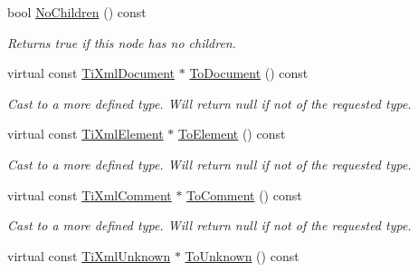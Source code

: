 \begin{DoxyCompactItemize}
\item 
bool \hyperlink{class_ti_xml_node_aeed21ad30630ef6e7faf096127edc9f3}{No\+Children} () const \hypertarget{class_ti_xml_node_aeed21ad30630ef6e7faf096127edc9f3}{}\label{class_ti_xml_node_aeed21ad30630ef6e7faf096127edc9f3}

\begin{DoxyCompactList}\small\item\em Returns true if this node has no children. \end{DoxyCompactList}\item 
virtual const \hyperlink{class_ti_xml_document}{Ti\+Xml\+Document} $\ast$ \hyperlink{class_ti_xml_node_a8a4cda4b15c29f64cff419309aebed08}{To\+Document} () const \hypertarget{class_ti_xml_node_a8a4cda4b15c29f64cff419309aebed08}{}\label{class_ti_xml_node_a8a4cda4b15c29f64cff419309aebed08}

\begin{DoxyCompactList}\small\item\em Cast to a more defined type. Will return null if not of the requested type. \end{DoxyCompactList}\item 
virtual const \hyperlink{class_ti_xml_element}{Ti\+Xml\+Element} $\ast$ \hyperlink{class_ti_xml_node_a72abed96dc9667ab9e0a2a275301bb1c}{To\+Element} () const \hypertarget{class_ti_xml_node_a72abed96dc9667ab9e0a2a275301bb1c}{}\label{class_ti_xml_node_a72abed96dc9667ab9e0a2a275301bb1c}

\begin{DoxyCompactList}\small\item\em Cast to a more defined type. Will return null if not of the requested type. \end{DoxyCompactList}\item 
virtual const \hyperlink{class_ti_xml_comment}{Ti\+Xml\+Comment} $\ast$ \hyperlink{class_ti_xml_node_aa0a5086f9eaee910bbfdc7f975e26574}{To\+Comment} () const \hypertarget{class_ti_xml_node_aa0a5086f9eaee910bbfdc7f975e26574}{}\label{class_ti_xml_node_aa0a5086f9eaee910bbfdc7f975e26574}

\begin{DoxyCompactList}\small\item\em Cast to a more defined type. Will return null if not of the requested type. \end{DoxyCompactList}\item 
virtual const \hyperlink{class_ti_xml_unknown}{Ti\+Xml\+Unknown} $\ast$ \hyperlink{class_ti_xml_node_afd7205cf31d7a376929f8a36930627a2}{To\+Unknown} () const \hypertarget{class_ti_xml_node_afd7205cf31d7a376929f8a36930627a2}{}\label{class_ti_xml_node_afd7205cf31d7a376929f8a36930627a2}


\end{DoxyCompactItemize}
